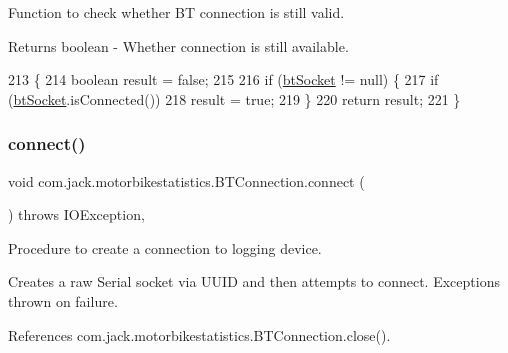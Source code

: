 Function to check whether BT connection is still valid. 

\begin{DoxyReturn}{Returns}
boolean -\/ Whether connection is still available. 
\end{DoxyReturn}

\begin{DoxyCode}
213                                  \{
214         \textcolor{keywordtype}{boolean} result = \textcolor{keyword}{false};
215 
216         \textcolor{keywordflow}{if} (\hyperlink{classcom_1_1jack_1_1motorbikestatistics_1_1_b_t_connection_a0d47f94a35f7c8a07429975446e7b33b}{btSocket} != null) \{
217             \textcolor{keywordflow}{if} (\hyperlink{classcom_1_1jack_1_1motorbikestatistics_1_1_b_t_connection_a0d47f94a35f7c8a07429975446e7b33b}{btSocket}.isConnected())
218                 result = \textcolor{keyword}{true};
219         \}
220         \textcolor{keywordflow}{return} result;
221     \}
\end{DoxyCode}
\mbox{\label{classcom_1_1jack_1_1motorbikestatistics_1_1_b_t_connection_a4c1b8ebff8a40a9cddd77a55b59b45af}} 
\subsubsection{\texorpdfstring{connect()}{connect()}}
{\footnotesize\ttfamily void com.\+jack.\+motorbikestatistics.\+B\+T\+Connection.\+connect (\begin{DoxyParamCaption}{ }\end{DoxyParamCaption}) throws I\+O\+Exception\hspace{0.3cm}{\ttfamily [inline]}, {\ttfamily [private]}}



Procedure to create a connection to logging device. 

Creates a raw Serial socket via U\+U\+ID and then attempts to connect. Exceptions thrown on failure. 

References com.\+jack.\+motorbikestatistics.\+B\+T\+Connection.\+close().



